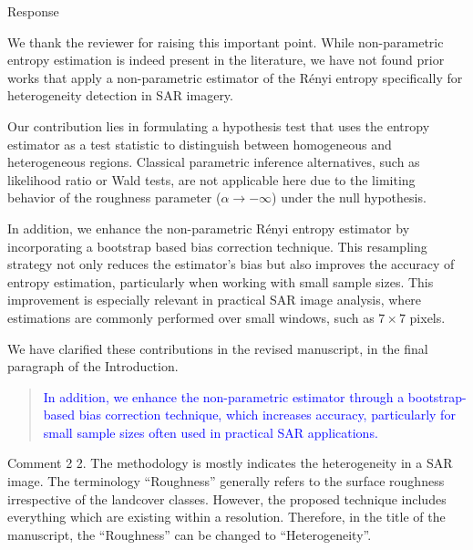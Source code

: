 \documentclass[11pt]{report}
\begin{document}
\begin{responsebox}{Response}


We thank the reviewer for raising this important point. While non-parametric entropy estimation is indeed present in the literature, we have not found prior works that apply a non-parametric estimator of the Rényi entropy specifically for heterogeneity detection in SAR imagery.

Our contribution lies in formulating a hypothesis test that uses the entropy estimator as a test statistic to distinguish between homogeneous and heterogeneous regions. Classical parametric inference alternatives, such as likelihood ratio or Wald tests, are not applicable here due to the limiting behavior of the roughness parameter (\(\alpha \to -\infty\)) under the null hypothesis.

In addition, we enhance the non-parametric Rényi entropy estimator by incorporating a bootstrap based bias correction technique. This resampling strategy not only reduces the estimator’s bias but also improves the accuracy of entropy estimation, particularly when working with small sample sizes. This improvement is especially relevant in practical SAR image analysis, where estimations are commonly performed over small windows, such as \(7 \times 7\) pixels.


We have clarified these contributions in the revised manuscript, in the final paragraph of the Introduction.



\begin{quote}
	\textcolor{blue}{ In addition, we enhance the non-parametric estimator through a bootstrap-based bias correction technique, which increases accuracy, particularly for small sample sizes often used in practical SAR applications.}
\end{quote}

\end{responsebox}

\vspace{2em}
\begin{reviewbox}{Comment 2}
2. The methodology is mostly indicates the heterogeneity in a SAR image. The terminology ``Roughness'' generally refers to the surface roughness irrespective of the landcover classes. However, the proposed technique includes everything which are existing within a resolution. Therefore, in the title of the manuscript, the ``Roughness'' can be changed to ``Heterogeneity''.
\end{reviewbox}
\end{document}
